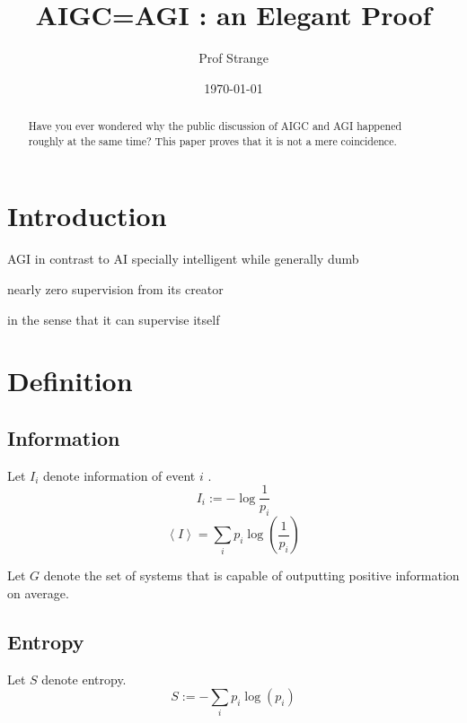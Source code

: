 \documentclass[12pt,amsmath,amsfonts,twocolumn]{revtex4-1}
\numberwithin{equation}{section}
\begin{document}
\title{AIGC=AGI : an Elegant Proof}
\author{Prof Strange}



\date{\today}


\begin{abstract}
Have you ever wondered why the public discussion of AIGC and AGI happened roughly at the same time? This paper proves that it is not a mere coincidence. 
\end{abstract} 

\maketitle




\section{Introduction}

AGI
in contrast to AI
specially intelligent while generally dumb

nearly zero supervision from its creator

in the sense that it can supervise itself






\section{Definition}

\subsection{Information}
Let $I_i$ denote information of event $i$ \cite{shannon} .
\begin{equation}
I_i:= - \log \dfrac{1}{p_i}
\end{equation}
\begin{equation}
\left\langle I \right\rangle = \sum_i p_i \log(\frac{1}{p_i}) 
\end{equation}

Let $G$ denote the set of systems that is capable of outputting positive information on average.

\subsection{Entropy}
Let $S$ denote entropy. 
\begin{equation}
S:= - \sum_i p_i \log(p_i)
\end{equation}
\end{document}

